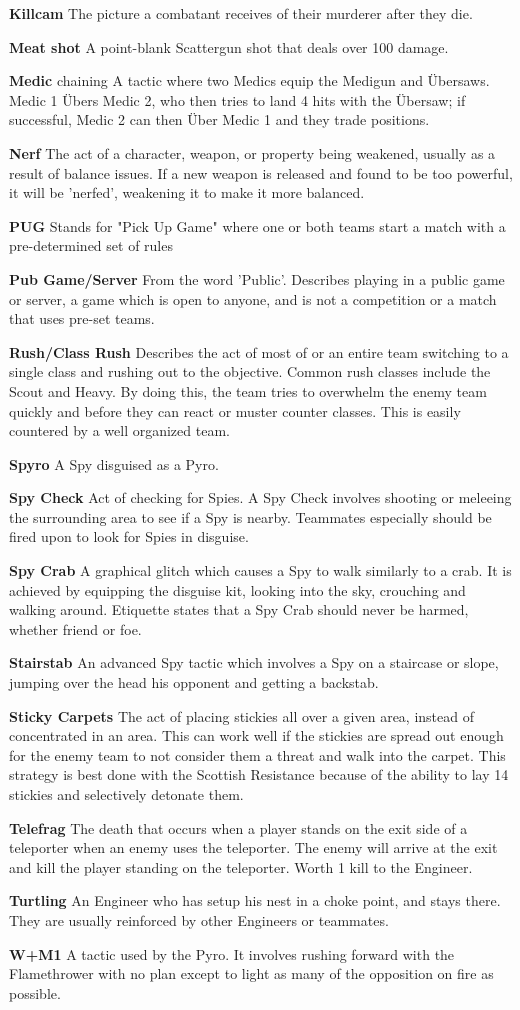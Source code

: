{\bf Killcam} The picture a combatant receives of their murderer after they die.
 
{\bf Meat shot} A point-blank Scattergun shot that deals over 100 damage.

{\bf Medic} chaining A tactic where two Medics equip the Medigun and Übersaws. Medic 1 Übers Medic 2, who then tries to land 4 hits with the Übersaw; if successful, Medic 2 can then Über Medic 1 and they trade positions.

{\bf Nerf} The act of a character, weapon, or property being weakened, usually as a result of balance issues. If a new weapon is released and found to be too powerful, it will be 'nerfed', weakening it to make it more balanced.

{\bf PUG} Stands for "Pick Up Game" where one or both teams start a match with a pre-determined set of rules

{\bf Pub Game/Server} From the word 'Public'. Describes playing in a public game or server, a game which is open to anyone, and is not a competition or a match that uses pre-set teams.

{\bf Rush/Class Rush} Describes the act of most of or an entire team switching to a single class and rushing out to the objective. Common rush classes include the Scout and Heavy. By doing this, the team tries to overwhelm the enemy team quickly and before they can react or muster counter classes. This is easily countered by a well organized team.

{\bf Spyro} A Spy disguised as a Pyro.

{\bf Spy Check} Act of checking for Spies. A Spy Check involves shooting or meleeing the surrounding area to see if a Spy is nearby.  Teammates especially should be fired upon to look for Spies in disguise.

{\bf Spy Crab} A graphical glitch which causes a Spy to walk similarly to a crab. It is achieved by equipping the disguise kit, looking into the sky, crouching and walking around. Etiquette states that a Spy Crab should never be harmed, whether friend or foe.

{\bf Stairstab} An advanced Spy tactic which involves a Spy on a staircase or slope, jumping over the head his opponent and getting a backstab.

{\bf Sticky Carpets} The act of placing stickies all over a given area, instead of concentrated in an area. This can work well if the stickies are spread out enough for the enemy team to not consider them a threat and walk into the carpet. This strategy is best done with the Scottish Resistance because of the ability to lay 14 stickies and selectively detonate them.

{\bf Telefrag} The death that occurs when a player stands on the exit side of a teleporter when an enemy uses the teleporter. The enemy will arrive at the exit and kill the player standing on the teleporter. Worth 1 kill to the Engineer. 

{\bf Turtling} An Engineer who has setup his nest in a choke point, and stays there. They are usually reinforced by other Engineers or teammates.

{\bf W+M1} A tactic used by the Pyro. It involves rushing forward with the Flamethrower with no plan except to light as many of the opposition on fire as possible.